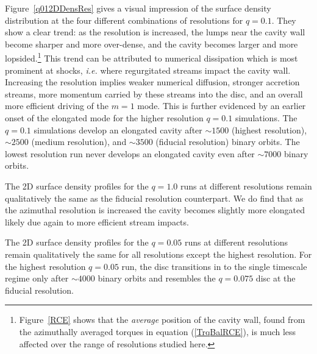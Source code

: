 Figure~\ref{q012DDensRes} gives a visual impression of the surface
density distribution at the four different combinations of resolutions
for $q=0.1$.  They show a clear
trend: as the resolution is increased, the lumps near the cavity wall
become sharper and more over-dense, and the cavity becomes larger and
more lopsided.\footnote{Figure~\ref{RCE} shows that the {\em average}
  position of the cavity wall, found from the azimuthally averaged
  torques in equation (\ref{TrqBalRCE}), is much less affected over
  the range of resolutions studied here.}  This trend can be
attributed to numerical dissipation which is most prominent at shocks, \textit{i.e.} where regurgitated streams
impact the cavity wall.  Increasing the resolution implies weaker
numerical diffusion, stronger accretion streams, more momentum
carried by these streams into the disc, and an overall more efficient driving of the
$m=1$ mode. 
This is further evidenced by an earlier onset of the elongated mode for the higher resolution $q=0.1$ simulations. The $q=0.1$ simulations develop an elongated cavity after $\sim 1500$ (highest resolution), $\sim 2500$ (medium resolution), and $\sim 3500$ (fiducial resolution) binary orbits. The lowest resolution run never develops an elongated cavity even after $\sim 7000$ binary orbits. 

The 2D surface density profiles for the $q=1.0$ runs at different resolutions remain qualitatively the same as the fiducial resolution counterpart. We do find that as the azimuthal  resolution is increased the cavity becomes slightly more elongated likely due again to more efficient stream impacts.

The 2D surface density profiles for the $q=0.05$ runs at different resolutions remain qualitatively the same for all resolutions except the highest resolution. For the highest resolution $q=0.05$ run, the disc transitions in to the single timescale regime only after $\sim 4000$ binary orbits and resembles the $q=0.075$ disc at the fiducial resolution.


